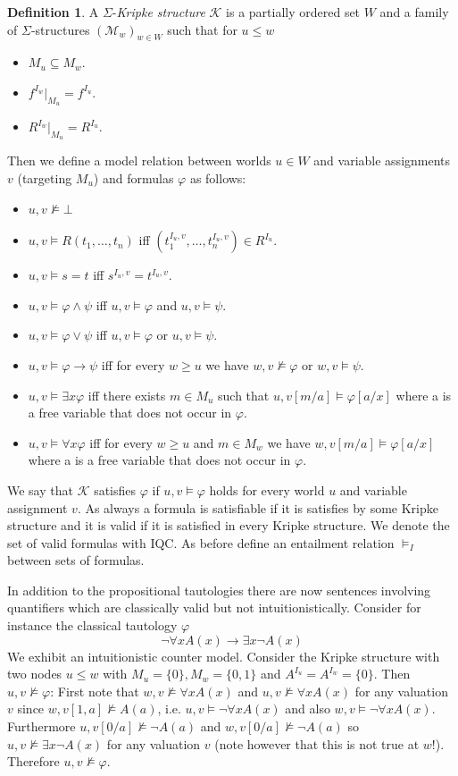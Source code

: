 \documentclass[a4paper,11pt]{report}
\theoremstyle{definition}
\theoremstyle{definition}
\theoremstyle{definition}
\theoremstyle{definition}
\theoremstyle{definition}
\newtheorem{definition}[theorem]{Definition}
\theoremstyle{definition}
\theoremstyle{definition}
\begin{document}
	\begin{definition}
		A $\Sigma$-\textit{Kripke structure} $\mathcal{K}$ is a partially ordered set $W$ and a family of $\Sigma$-structures $(\mathcal{M}_w)_{w\in W}$ such that for $u\leq w$
		\begin{itemize}
			\item $M_u\subseteq M_w$.
			\item $f^{I_w}|_{M_u} = f^{I_u}$.
			\item $R^{I_w}|_{M_u} = R^{I_u}$.
		\end{itemize}
		Then we define a model relation between worlds $u\in W$ and variable assignments $v$ (targeting $M_u$) and formulas $\varphi$ as follows:
		\begin{itemize}
			\item $u, v\not\models\bot$
			\item $u, v\models R(t_1,\dots,t_n)$ iff $(t_1^{I_u, v},\dots,t_n^{I_u, v})\in R^{I_u}$.
			\item $u, v\models s = t$ iff $s^{I_u, v} = t^{I_u, v}$.
			\item $u, v\models \varphi\wedge \psi$ iff $u, v\models\varphi$ and $u, v\models\psi$.
			\item $u, v\models \varphi\vee\psi$ iff $u, v\models\varphi$ or $u, v\models\psi$.
			\item $u, v\models \varphi\to\psi$ iff for every $w\geq u$ we have $w, v\not\models\varphi$ or $w, v\models\psi$.
			\item $u, v\models\exists x\varphi$ iff there exists $m\in M_u$ such that $u, v[m/a]\models\varphi[a/x]$ where a is a free variable that does not occur in $\varphi$.
			\item $u, v\models\forall x\varphi$ iff for every $w\geq u$ and $m\in M_w$ we have $w, v[m/a]\models\varphi[a/x]$ where a is a free variable that does not occur in $\varphi$.
		\end{itemize}
		We say that $\mathcal{K}$ satisfies $\varphi$ if $u, v\models\varphi$ holds for every world $u$ and variable assignment $v$. As always a formula is satisfiable if it is satisfies by some Kripke structure and it is valid if it is satisfied in every Kripke structure. We denote the set of valid formulas with IQC.  As before define an entailment relation $\models_I$ between sets of formulas.
	\end{definition}
	In addition to the propositional tautologies there are now sentences involving quantifiers which are classically valid but not intuitionistically.
	Consider for instance the classical tautology $\varphi$ $$\neg\forall x A(x)\to \exists x \neg A(x)$$We exhibit an intuitionistic counter model. Consider the Kripke structure with two nodes $u\leq w$ with $M_u = \{0\}, M_w = \{0, 1\}$ and $A^{I_u} = A^{I_w} = \{0\}$. Then $u, v\not\models \varphi$: First note that $w, v\not\models\forall xA(x)$ and $u, v\not\models\forall xA(x)$ for any valuation $v$ since $w, v[1, a]\not\models A(a)$, i.e. $u, v\models\neg\forall xA(x)$ and also $w, v\models\neg\forall xA(x)$. Furthermore $u, v[0/a]\not\models \neg A(a)$ and $w, v[0/a]\not\models \neg A(a)$ so $u, v\not\models \exists x\neg A(x)$ for any valuation $v$ (note however that this is not true at $w$!). Therefore $u, v\not\models\varphi$.
	
\end{document}
